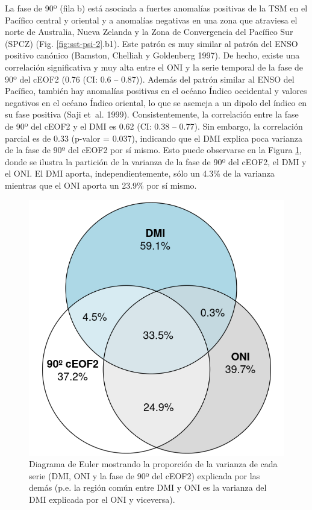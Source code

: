 \documentclass[12pt,oneside,a4paper]{reedthesis}
\begin{document}
La fase de 90º (fila b) está asociada a fuertes anomalías positivas de la TSM en el Pacífico central y oriental y a anomalías negativas en una zona que atraviesa el norte de Australia, Nueva Zelanda y la Zona de Convergencia del Pacífico Sur (SPCZ) (Fig. \ref{fig:sst-psi-2}.b1).
Este patrón es muy similar al patrón del ENSO positivo canónico (Bamston, Chelliah y Goldenberg 1997).
De hecho, existe una correlación significativa y muy alta entre el ONI y la serie temporal de la fase de 90º del cEOF2 (0.76 (CI: 0.6 -- 0.87)).
Además del patrón similar al ENSO del Pacífico, también hay anomalías positivas en el océano Índico occidental y valores negativos en el océano Índico oriental, lo que se asemeja a un dipolo del índico en su fase positiva (Saji et~al. 1999).
Consistentemente, la correlación entre la fase de 90º del cEOF2 y el DMI es 0.62 (CI: 0.38 -- 0.77).
Sin embargo, la correlación parcial es de 0.33 (p-valor = 0.037), indicando que el DMI explica poca varianza de la fase de 90º del cEOF2 por sí mismo.
Esto puede observarse en la Figura \ref{fig:euler}, donde se ilustra la partición de la varianza de la fase de 90º del cEOF2, el DMI y el ONI.
El DMI aporta, independientemente, sólo un 4.3\% de la varianza mientras que el ONI aporta un 23.9\% por sí mismo.

\begin{figure}

{\centering \includegraphics{figures/20-ceofs/euler-1} 

}

\caption{Diagrama de Euler mostrando la proporción de la varianza de cada serie (DMI, ONI y la fase de 90º del cEOF2) explicada por las demás (p.e. la región común entre DMI y ONI es la varianza del DMI explicada por el ONI y viceversa).}\label{fig:euler}
\end{figure}
\end{document}
